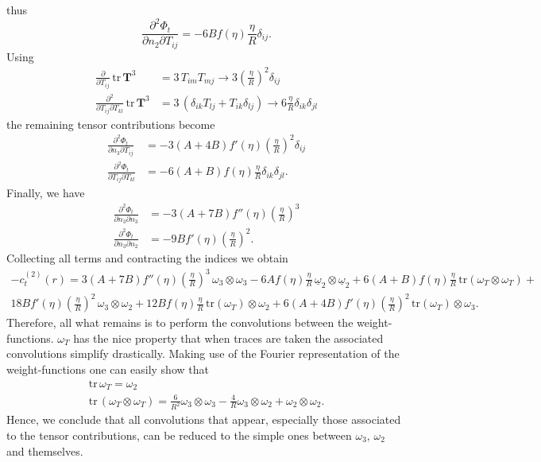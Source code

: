 \documentclass{article}
\begin{document}
thus
\begin{equation}
	\frac{\partial^2\Phi_{t}}{\partial n_2\partial T_{ij}} = -6Bf(\eta)\frac{\eta}{R}\delta_{ij}.
\end{equation}
Using
\begin{align}
	\frac{\partial}{\partial T_{ij}}\,\text{tr}\,\mathbf{T}^3 &= 3\,T_{im}T_{mj}\rightarrow 3\left(\frac{\eta}{R}\right)^2\delta_{ij}\\\nonumber
	\frac{\partial^2}{\partial T_{ij}\partial T_{kl}}\,\text{tr}\,\mathbf{T}^3 &=3\,\left(\delta_{ik}T_{lj} + T_{ik}\delta_{lj}\right)\rightarrow 6\frac{\eta}{R}\delta_{ik}\delta_{jl}
\end{align}
the remaining tensor contributions become
\begin{align}
	\frac{\partial^2\Phi_{t}}{\partial n_3\partial T_{ij}} &= -3(A+4B)f'(\eta)\left(\frac{\eta}{R}\right)^2\delta_{ij}\\\nonumber
	\frac{\partial^2\Phi_{t}}{\partial T_{ij}\partial T_{kl}} &= -6(A+B)f(\eta)\frac{\eta}{R}\delta_{ik}\delta_{jl}.
\end{align}
Finally, we have
\begin{align}
	\frac{\partial^2\Phi_{t}}{\partial n_3\partial n_3} &= -3(A+7B)f''(\eta)\left(\frac{\eta}{R}\right)^3\\\nonumber
	\frac{\partial^2\Phi_{t}}{\partial n_3\partial n_2} &= -9Bf'(\eta)\left(\frac{\eta}{R}\right)^2.
\end{align}
Collecting all terms and contracting the indices we obtain
\begin{gather}
	-c^{(2)}_t(r) = 3(A+7B)f''(\eta)\left(\frac{\eta}{R}\right)^3\,\omega_3\otimes\omega_3 - 6Af(\eta)\frac{\eta}{R}\,\underline{\omega}_2\otimes\underline{\omega}_2 + 6(A+B)f(\eta)\frac{\eta}{R}\,\text{tr}\left(\omega_T\otimes\omega_T\right)+\\\nonumber
	18Bf'(\eta)\left(\frac{\eta}{R}\right)^2\,\omega_3\otimes\omega_2+12Bf(\eta)\frac{\eta}{R}\,\text{tr}(\omega_T)\otimes\omega_2+6(A+4B)f'(\eta)\left(\frac{\eta}{R}\right)^2\,\text{tr}(\omega_T)\otimes\omega_3.
\end{gather}
Therefore, all what remains is to perform the convolutions between the weight-functions. $\omega_T$ has the nice property that when traces are taken the associated convolutions simplify drastically. Making use of the Fourier representation of the weight-functions one can easily show that
\begin{gather}
	\text{tr}\,\omega_T = \omega_2\\\nonumber
	\text{tr}\,\left(\omega_T\otimes\omega_T\right) = \frac{6}{R^2}\omega_3\otimes\omega_3-\frac{4}{R}\omega_3\otimes\omega_2 + \omega_2\otimes\omega_2.
\end{gather}
Hence, we conclude that all convolutions that appear, especially those associated to the tensor contributions, can be reduced to the simple ones between $\omega_3$, $\omega_2$ and themselves.
\end{document}
